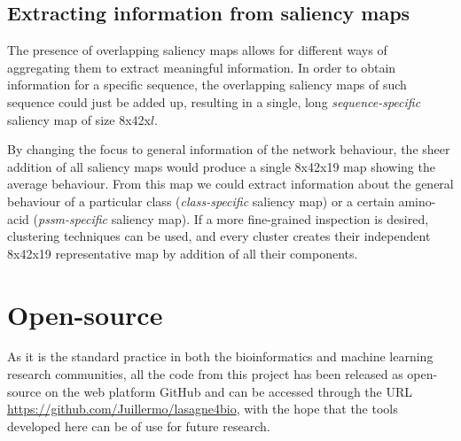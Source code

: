 \subsection{Extracting information from saliency maps}
The presence of overlapping saliency maps allows for different ways of aggregating them to extract meaningful information. In order to obtain information for a specific sequence, the overlapping saliency maps of such sequence could just be added up, resulting in a single, long \textit{sequence-specific} saliency map of size 8x42x$l$.

By changing the focus to general information of the network behaviour, the sheer addition of all saliency maps would produce a single 8x42x19 map showing the average behaviour. From this map we could extract information about the general behaviour of a particular class (\textit{class-specific} saliency map) or a certain amino-acid (\textit{pssm-specific} saliency map). If a more fine-grained inspection is desired, clustering techniques can be used, and every cluster creates their independent 8x42x19 representative map by addition of all their components.





\section{Open-source}

As it is the standard practice in both the bioinformatics and machine learning research communities, all the code from this project has been released as open-source on the web platform GitHub and can be accessed through the URL \url{https://github.com/Juillermo/lasagne4bio}, with the hope that the tools developed here can be of use for future research.
